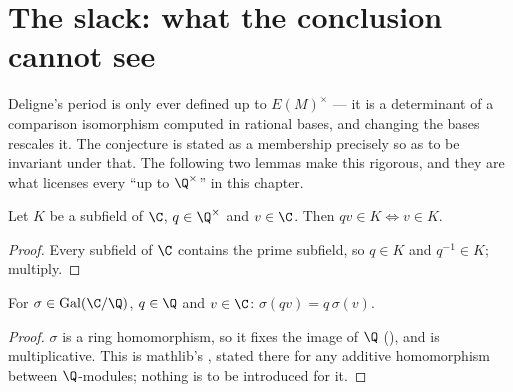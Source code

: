 \section{The slack: what the conclusion cannot see}
\label{sec:sympow-slack}

Deligne's period is only ever defined up to $E(M)^{\times}$ --- it is a determinant of a
comparison isomorphism computed in rational bases, and changing the bases rescales it. The
conjecture is stated as a membership precisely so as to be invariant under that. The following
two lemmas make this rigorous, and they are what licenses every ``up to $\Q^{\times}$'' in
this chapter.

\begin{lemma}
  \label{lem:rat-smul-mem}
  Let $K$ be a subfield of $\C$, $q \in \Q^{\times}$ and $v \in \C$. Then
  $qv \in K \iff v \in K$.
\end{lemma}
\begin{proof}
  Every subfield of $\C$ contains the prime subfield, so $q \in K$ and $q^{-1} \in K$; multiply.
\end{proof}

\begin{lemma}
  \label{lem:rat-smul-map}
  For $\sigma \in \operatorname{Gal}(\C/\Q)$, $q \in \Q$ and $v \in \C$:
  $\sigma(qv) = q\,\sigma(v)$.
\end{lemma}
\begin{proof}
  $\sigma$ is a ring homomorphism, so it fixes the image of $\Q$ (), and is
  multiplicative. This is mathlib's , stated there for any additive
  homomorphism between $\Q$-modules; nothing is to be introduced for it.
\end{proof}

